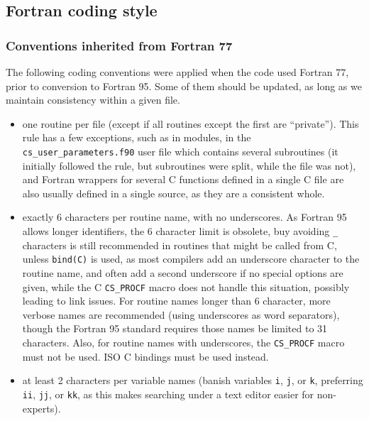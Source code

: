 \subsection{Fortran coding style}

\subsubsection{Conventions inherited from Fortran 77}

The following coding conventions were applied when the code used
Fortran 77, prior to conversion to Fortran 95. Some of them should be
updated, as long as we maintain consistency within a given
file.

\begin{itemize}

\item one routine per file (except if all routines except the first
      are ``private''). This rule has a few exceptions, such as in modules,
      in the \texttt{cs\_user\_parameters.f90} user file which contains several
      subroutines (it initially followed the rule, but subroutines were split,
      while the file was not), and Fortran wrappers for several C
      functions defined in a single C file are also usually defined
      in a single source, as they are a consistent whole.
 
\item exactly 6 characters per routine name, with no underscores.
      As Fortran 95 allows longer identifiers, the 6 character limit is
      obsolete, buy avoiding \texttt{\_} characters is still recommended
      in routines that might be called from C, unless \texttt{bind(C)}
      is used, as most compilers add an underscore character to the routine
      name, and often add a second underscore if no special options are given,
      while the C \texttt{CS\_PROCF} macro does not handle this situation,
      possibly leading to link issues.
      For routine names longer than 6 character, more verbose names
      are recommended (using underscores as word separators), though
      the Fortran 95 standard requires those names be limited to 31
      characters.
      Also, for routine names with underscores, the \texttt{CS\_PROCF}
      macro must not be used. ISO C bindings must be used instead.

\item at least 2 characters per variable names 
      (banish variables \texttt{i}, \texttt{j}, or \texttt{k},
       preferring \texttt{ii}, \texttt{jj}, or \texttt{kk}, as this makes
       searching under a text editor easier for non-experts).


\end{itemize}
